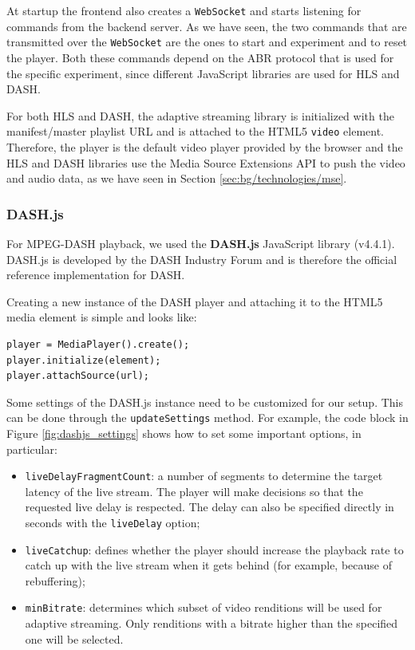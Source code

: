At startup the frontend also creates a \texttt{WebSocket} and starts listening for commands from the backend server. As we have seen, the two commands that are transmitted over the \texttt{WebSocket} are the ones to start and experiment and to reset the player. Both these commands depend on the ABR protocol that is used for the specific experiment, since different JavaScript libraries are used for HLS and DASH.

For both HLS and DASH, the adaptive streaming library is initialized with the manifest/master playlist URL and is attached to the HTML5 \texttt{video} element. Therefore, the player is the default video player provided by the browser and the HLS and DASH libraries use the Media Source Extensions API to push the video and audio data, as we have seen in Section \ref{sec:bg/technologies/mse}.

\subsubsection{DASH.js}
\label{sec:eval/testbed/frontend/dashjs}

For MPEG-DASH playback, we used the \textbf{DASH.js} JavaScript library (v4.4.1). DASH.js is developed by the DASH Industry Forum and is therefore the official reference implementation for DASH.

Creating a new instance of the DASH player and attaching it to the HTML5 media element is simple and looks like:

\begin{verbatim}
player = MediaPlayer().create();
player.initialize(element);
player.attachSource(url);
\end{verbatim}

Some settings of the DASH.js instance need to be customized for our setup. This can be done through the \texttt{updateSettings} method. For example, the code block in Figure \ref{fig:dashjs_settings} shows how to set some important options, in particular:

\begin{itemize}
    \item \texttt{liveDelayFragmentCount}: a number of segments to determine the target latency of the live stream. The player will make decisions so that the requested live delay is respected. The delay can also be specified directly in seconds with the \texttt{liveDelay} option;
    \item \texttt{liveCatchup}: defines whether the player should increase the playback rate to catch up with the live stream when it gets behind (for example, because of rebuffering);
    \item \texttt{minBitrate}: determines which subset of video renditions will be used for adaptive streaming. Only renditions with a bitrate higher than the specified one will be selected.
\end{itemize}

